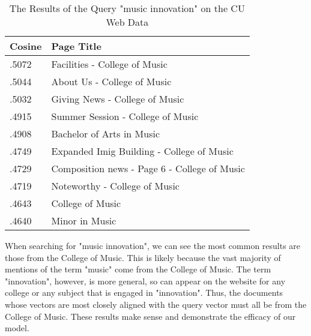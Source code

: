 

\begin{table}[h]
\centering
\begin{tabular}{| l | l |}
\hline
\textbf{Cosine} & \textbf{Page Title} \\ \hline
.5072        & Facilities - College of Music \\ \hline
.5044        & About Us - College of Music \\ \hline
.5032        & Giving News - College of Music \\ \hline
.4915        & Summer Session - College of Music \\ \hline
.4908        & Bachelor of Arts in Music \\ \hline
.4749        & Expanded Imig Building - College of Music \\ \hline
.4729        & Composition news - Page 6 - College of Music \\ \hline
.4719        & Noteworthy - College of Music \\ \hline
.4643        & College of Music \\ \hline
.4640        & Minor in Music \\ \hline

\end{tabular}
\caption{The Results of the Query "music innovation" on the CU Web Data}
\label{table:querymusic}
\vspace{-4mm}
\end{table}


When searching for "music innovation", we can see the most common results are those from the College of Music. This is likely because the vast majority of mentions of the term "music" come from the College of Music. The term "innovation", however, is more general, so can appear on the website for any college or any subject that is engaged in "innovation". Thus, the documents whose vectors are most closely aligned with the query vector must all be from the College of Music. These results make sense and demonstrate the efficacy of our model.


